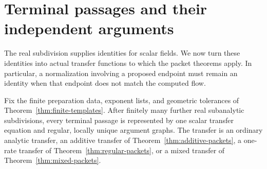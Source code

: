 \section{Terminal passages and their independent arguments}
\label{sec:terminal}

The real subdivision supplies identities for scalar fields.  We now turn
these identities into actual transfer functions to which the packet theorems
apply.  In particular, a normalization involving a proposed endpoint must
remain an identity when that endpoint does not match the computed flow.

\begin{theorem}\label{thm:terminal-reduction}
Fix the finite preparation data, exponent lists, and geometric tolerances of
Theorem~\ref{thm:finite-templates}.  After finitely many further real
subanalytic subdivisions, every terminal passage is represented by one scalar
transfer equation and regular, locally unique argument graphs.  The transfer
is an ordinary analytic transfer, an additive transfer of
Theorem~\ref{thm:additive-packets}, a one-rate transfer of
Theorem~\ref{thm:regular-packets}, or a mixed transfer of
Theorem~\ref{thm:mixed-packets}.


\end{theorem}
